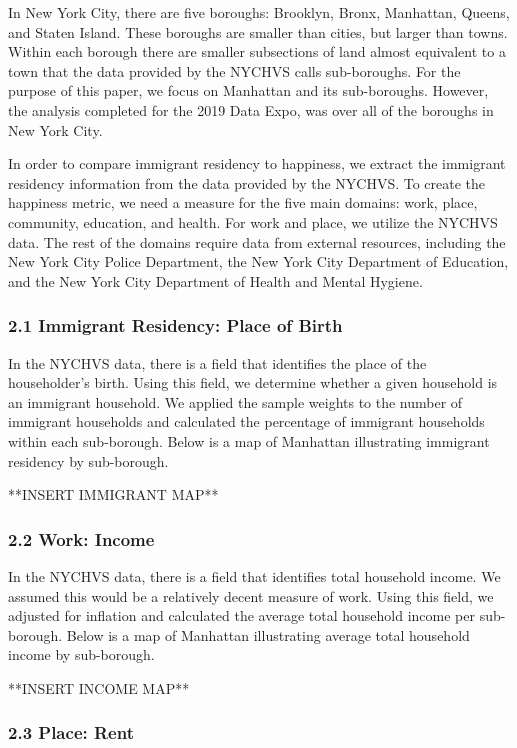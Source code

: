 \documentclass{article}\usepackage[]{graphicx}\usepackage[]{color}
\begin{document}
In New York City, there are five boroughs: Brooklyn, Bronx, Manhattan, Queens, and Staten Island. These boroughs are smaller than cities, but larger than towns. Within each borough there are smaller subsections of land almost equivalent to a town that the data provided by the NYCHVS calls sub-boroughs. For the purpose of this paper, we focus on Manhattan and its sub-boroughs. However, the analysis completed for the 2019 Data Expo, was over all of the boroughs in New York City.

In order to compare immigrant residency to happiness, we extract the immigrant residency information from the data provided by the NYCHVS. To create the happiness metric, we need a measure for the five main domains: work, place, community, education, and health. For work and place, we utilize the NYCHVS data. The rest of the domains require data from external resources, including the New York City Police Department, the New York City Department of Education, and the New York City Department of Health and Mental Hygiene.

\subsubsection*{2.1 Immigrant Residency: Place of Birth}


In the NYCHVS data, there is a field that identifies the place of the householder's birth. Using this field, we determine whether a given household is an immigrant household. We applied the sample weights to the number of immigrant households and calculated the percentage of immigrant households within each sub-borough. Below is a map of Manhattan illustrating immigrant residency by sub-borough.

**INSERT IMMIGRANT MAP**

\subsubsection*{2.2 Work: Income}

In the NYCHVS data, there is a field that identifies total household income. We assumed this would be a relatively decent measure of work. Using this field, we adjusted for inflation and calculated the average total household income per sub-borough. Below is a map of Manhattan illustrating average total household income by sub-borough.

**INSERT INCOME MAP**

\subsubsection*{2.3 Place: Rent}
\end{document}
